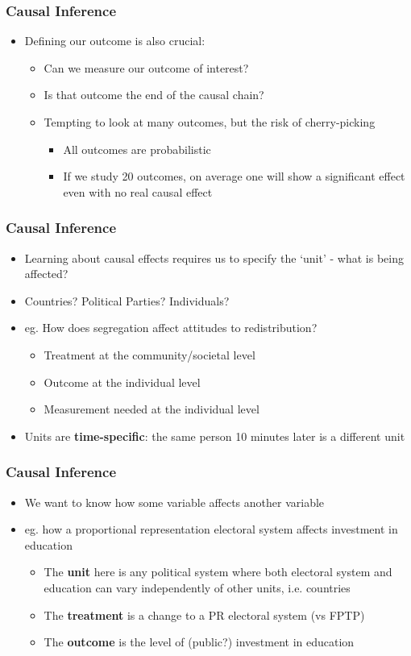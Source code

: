 \documentclass[xcolor=x11names,compress]{beamer}\usepackage[]{graphicx}\usepackage[]{color}
\renewcommand{\(}{\begin{columns}}
\renewcommand{\)}{\end{columns}}
\newcommand{\<}[1]{\begin{column}{#1}}
\renewcommand{\>}{\end{column}}
\begin{document}
\begin{frame}
\frametitle{Causal Inference}
\begin{itemize}
\item Defining our outcome is also crucial:
\begin{itemize}
\item Can we measure our outcome of interest?
\item Is that outcome the end of the causal chain?
\item Tempting to look at many outcomes, but the risk of cherry-picking
\begin{itemize}
\item All outcomes are probabilistic
\item If we study 20 outcomes, on average one will show a significant effect even with no real causal effect
\end{itemize}
\end{itemize}
\end{itemize}
\end{frame}

\begin{frame}
\frametitle{Causal Inference}
\begin{itemize}
\item Learning about causal effects requires us to specify the `unit' - what is being affected?
\item Countries? Political Parties? Individuals?
\item eg. How does segregation affect attitudes to redistribution?
\begin{itemize}
\item Treatment at the community/societal level
\item Outcome at the individual level
\item Measurement needed at the individual level
\end{itemize}
\item Units are \textbf{time-specific}: the same person 10 minutes later is a different unit
\end{itemize}
\end{frame}

\begin{frame}
\frametitle{Causal Inference}
\begin{itemize}
\item We want to know how some variable affects another variable
\item eg. how a proportional representation electoral system affects investment in education
\begin{itemize}
\item The \textbf{unit} here is any political system where both electoral system and education can vary independently of other units, i.e. countries
\item The \textbf{treatment} is a change to a PR electoral system (vs FPTP)
\item The \textbf{outcome} is the level of (public?) investment in education
\end{itemize}
\end{itemize}
\end{frame}
\end{document}
